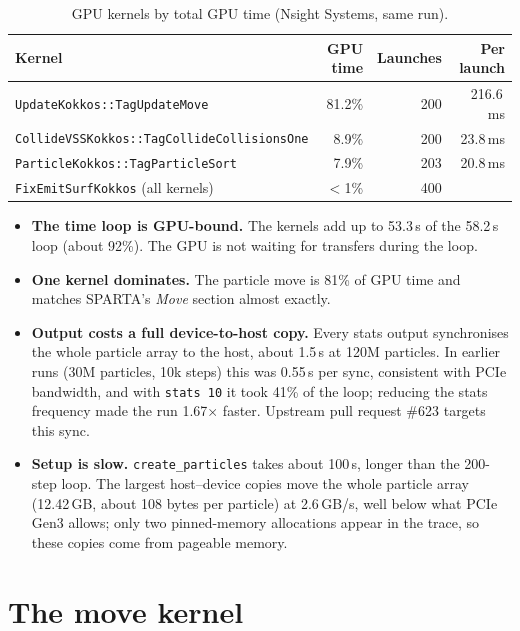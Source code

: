 \documentclass[11pt,a4paper]{article}
\newcommand{\code}[1]{\texttt{#1}}
\begin{document}
\begin{table}[h]
\centering
\begin{tabular}{lrrr}
\toprule
Kernel & GPU time & Launches & Per launch \\
\midrule
\code{UpdateKokkos::TagUpdateMove}              & 81.2\% & 200 & 216.6\,ms \\
\code{CollideVSSKokkos::TagCollideCollisionsOne}&  8.9\% & 200 &  23.8\,ms \\
\code{ParticleKokkos::TagParticleSort}          &  7.9\% & 203 &  20.8\,ms \\
\code{FixEmitSurfKokkos} (all kernels)          & $<$1\% & 400 &  \\
\bottomrule
\end{tabular}
\caption{GPU kernels by total GPU time (Nsight Systems, same run).}
\label{tab:gpu-kernels}
\end{table}

\begin{itemize}
  \item \textbf{The time loop is GPU-bound.} The kernels add up to 53.3\,s of
        the 58.2\,s loop (about 92\%). The GPU is not waiting for transfers
        during the loop.
  \item \textbf{One kernel dominates.} The particle move is 81\% of GPU time
        and matches SPARTA's \emph{Move} section almost exactly.
  \item \textbf{Output costs a full device-to-host copy.} Every stats output
        synchronises the whole particle array to the host, about 1.5\,s at
        120M particles. In earlier runs (30M particles, 10k steps) this was
        0.55\,s per sync, consistent with PCIe bandwidth, and with
        \code{stats 10} it took 41\% of the loop; reducing the stats frequency
        made the run 1.67$\times$ faster. Upstream pull request \#623 targets
        this sync.
  \item \textbf{Setup is slow.} \code{create\_particles} takes about 100\,s,
        longer than the 200-step loop. The largest host--device copies move the
        whole particle array (12.42\,GB, about 108 bytes per particle) at
        2.6\,GB/s, well below what PCIe Gen3 allows; only two pinned-memory
        allocations appear in the trace, so these copies come from pageable
        memory.
\end{itemize}

\section{The move kernel}
\end{document}
